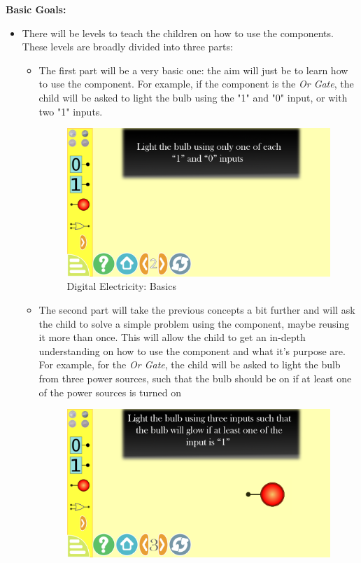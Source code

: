 \documentclass[preprint,12pt]{elsarticle}
\begin{document}
\textbf{Basic Goals:}

\begin{itemize}
\item There will be levels to teach the children on how to use the components. These levels are broadly divided into three parts:
\begin{itemize}
\item The first part will be a very basic one: the aim will just be to learn how to use the component. For example, if the component is the \textit{Or Gate}, the child will be asked to light the bulb using the "1" and "0" input, or with two "1" inputs.
\begin{figure}[H]
\centering\includegraphics[width=1.0\linewidth]{digital_level_2}
\caption{Digital Electricity: Basics}
\end{figure}
\item The second part will take the previous concepts a bit further and will ask the child to solve a simple problem using the component, maybe reusing it more than once. This will allow the child to get an in-depth understanding on how to use the component and what it’s purpose are. For example, for the \textit{Or Gate}, the child will be asked to light the bulb from three power sources, such that the bulb should be on if at least one of the power sources is turned on
\begin{figure}[H]
\centering\includegraphics[width=1.0\linewidth]{digital_level_3}

\end{figure}
\end{itemize}
\end{itemize}
\end{document}
